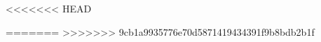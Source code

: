 \documentclass[]{mcdowellcv}
\newcommand{\MyPath}{/home/jo/Documents/mcdowell-cv/}
\begin{document}
	\makeheader	
	
	\begin{flushleft}
	
	
	
	
<<<<<<< HEAD
	\end{flushleft}
=======
>>>>>>> 9cb1a9935776e70d5871419434391f9b8bdb2b1f
	
\end{document}
